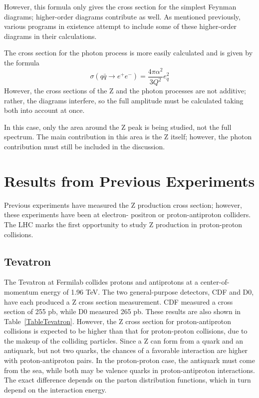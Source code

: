 

However, this formula only gives the cross section 
for the simplest Feynman diagrams; 
higher-order diagrams contribute as well.  
As mentioned previously, various programs 
in existence attempt to include some of these higher-order 
diagrams in their calculations.  





The cross section for the photon process 
is more easily calculated and is given by the formula
\[
\sigma(q \bar{q} \rightarrow e^+ e^-) 
= \frac{4 \pi \alpha^2}{3 Q^2} e_q^2
\]
However, the cross sections of the Z and the photon 
processes are not additive; 
rather, the diagrams interfere, 
so the full amplitude must be calculated taking 
both into account at once.  

In this case, only the area around the Z peak is being 
studied, not the full spectrum.  
The main contribution in this area is the Z itself; 
however, the photon contribution must still be included 
in the discussion.  


\section{Results from Previous Experiments}
\label{theory:prev}

Previous experiments have measured the 
Z production cross section; 
however, these experiments have been at electron-
positron or proton-antiproton colliders.  
The LHC marks the first opportunity to study 
Z production in proton-proton collisions.  %

\subsection{Tevatron}

The Tevatron at Fermilab collides protons and antiprotons 
at a center-of-momentum energy of 1.96 TeV.  
The two general-purpose detectors, CDF and D0, 
have each produced a Z cross section measurement.  
CDF measured a cross section of 255 pb, while D0 measured 265 pb.  
These results are also shown in 
Table~\ref{TableTevatron}.  
However, the Z cross section for proton-antiproton collisions 
is expected to be higher than that for proton-proton collisions, 
due to the makeup of the 
colliding particles.  
Since a Z can form from a quark and an antiquark, 
but not two quarks, the chances of a favorable 
interaction are higher with proton-antiproton pairs.  
In the proton-proton case, the antiquark must come from the sea, 
while both may be valence quarks in proton-antiproton interactions.  
The exact difference depends on the parton 
distribution functions, 
which in turn depend on the interaction energy.  

